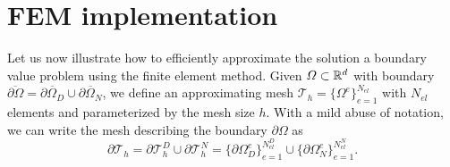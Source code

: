 \section{FEM implementation}\label{sec:finite-element-implementation}
Let us now illustrate how to efficiently approximate the solution a boundary value problem using the finite element method. Given $\Omega\subset \mathbb{R}^d$ with boundary $\overline{\partial \Omega} = \overline{\partial\Omega_D} \cup \overline{\partial\Omega_N}$, we define an approximating mesh  $\mathcal{T}_h = \{\Omega^e\}_{e=1}^{N_{el}}$ with $N_{el}$ elements and parameterized by the mesh size $h$. With a mild abuse of notation, we can write the mesh describing the boundary $\partial\Omega$ as 
\begin{equation}
    \partial\mathcal{T}_h = \partial\mathcal{T}_h^D \cup\partial\mathcal{T}_h^N = \{\partial\Omega^e_D\}_{e=1}^{N_{el}^D} \cup \{\partial\Omega^e_N\}_{e=1}^{N_{el}^N}.
\end{equation}

